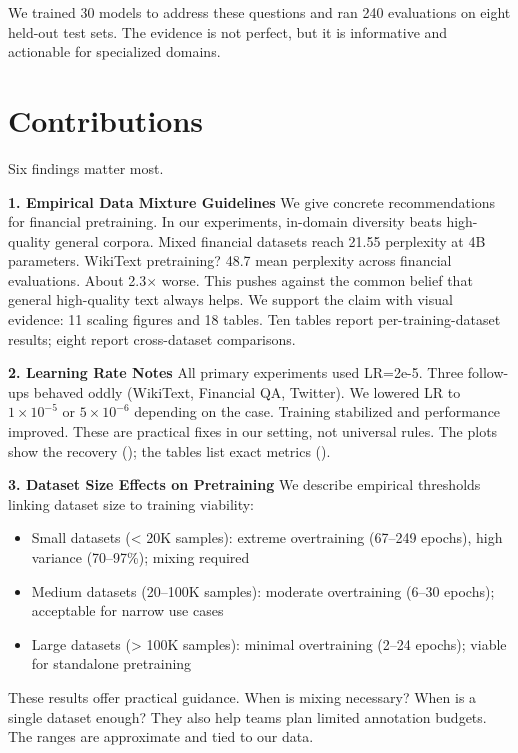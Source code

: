 We trained 30 models to address these questions and ran 240 evaluations on eight held-out test sets. The evidence is not perfect, but it is informative and actionable for specialized domains.

\section{Contributions}

Six findings matter most.

\textbf{1. Empirical Data Mixture Guidelines}
We give concrete recommendations for financial pretraining. In our experiments, in-domain diversity beats high-quality general corpora. Mixed financial datasets reach 21.55 perplexity at 4B parameters. WikiText pretraining? 48.7 mean perplexity across financial evaluations. About 2.3$\times$ worse. This pushes against the common belief that general high-quality text always helps. We support the claim with visual evidence: 11 scaling figures and 18 tables. Ten tables report per-training-dataset results; eight report cross-dataset comparisons.

\textbf{2. Learning Rate Notes}
All primary experiments used LR=2e-5. Three follow-ups behaved oddly (WikiText, Financial QA, Twitter). We lowered LR to $1\times10^{-5}$ or $5\times10^{-6}$ depending on the case. Training stabilized and performance improved. These are practical fixes in our setting, not universal rules. The plots show the recovery (); the tables list exact metrics ().

\textbf{3. Dataset Size Effects on Pretraining}
We describe empirical thresholds linking dataset size to training viability:
\begin{itemize}
    \item Small datasets (< 20K samples): extreme overtraining (67--249 epochs), high variance (70--97\%); mixing required
    \item Medium datasets (20--100K samples): moderate overtraining (6--30 epochs); acceptable for narrow use cases
    \item Large datasets (> 100K samples): minimal overtraining (2--24 epochs); viable for standalone pretraining
\end{itemize}
These results offer practical guidance. When is mixing necessary? When is a single dataset enough? They also help teams plan limited annotation budgets. The ranges are approximate and tied to our data.

